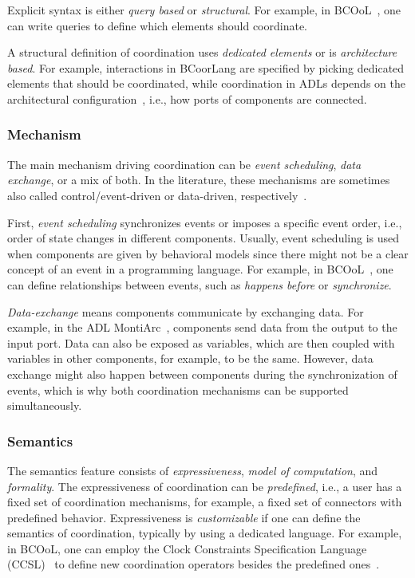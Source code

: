 \documentclass[runningheads]{llncs}
\begin{document}
Explicit syntax is either \textit{query based} or \textit{structural}.
For example, in BCOoL~\cite{varalarsenBCOolBehavioralCoordination2016,varalarsenBehavioralCoordinationOperator2015}, one can write queries to define which elements should coordinate.

A structural definition of coordination uses \textit{dedicated elements} or is \textit{architecture based}.
For example, interactions in BCoorLang are specified by picking dedicated elements that should be coordinated, while coordination in ADLs depends on the architectural configuration~\cite{medvidovicClassificationComparisonFramework2000}, i.e., how ports of components are connected.

\subsubsection{Mechanism} The main mechanism driving coordination can be \textit{event scheduling}, \textit{data exchange}, or a mix of both.
In the literature, these mechanisms are sometimes also called control/event-driven or data-driven, respectively~\cite{papadopoulosCoordinationModelsLanguages1998,varalarsenBCOolBehavioralCoordination2016}.

First, \textit{event scheduling} synchronizes events or imposes a specific event order, i.e., order of state changes in different components.
Usually, event scheduling is used when components are given by behavioral models since there might not be a clear concept of an event in a programming language.
For example, in BCOoL~\cite{varalarsenBehavioralCoordinationOperator2015}, one can define relationships between events, such as \textit{happens before} or \textit{synchronize}.

\textit{Data-exchange} means components communicate by exchanging data.
For example, in the ADL MontiArc~\cite{haberMontiArcArchitecturalModeling2014}, components send data from the output to the input port.
Data can also be exposed as variables, which are then coupled with variables in other components, for example, to be the same.
However, data exchange might also happen between components during the synchronization of events, which is why both coordination mechanisms can be supported simultaneously.

\subsubsection{Semantics} The semantics feature consists of \textit{expressiveness}, \textit{model of computation}, and \textit{formality}.
The expressiveness of coordination can be \textit{predefined}, i.e., a user has a fixed set of coordination mechanisms, for example, a fixed set of connectors with predefined behavior.
Expressiveness is \textit{customizable} if one can define the semantics of coordination, typically by using a dedicated language.
For example, in BCOoL, one can employ the Clock Constraints Specification Language (CCSL)~\cite{andreSyntaxSemanticsClock2009} to define new coordination operators besides the predefined ones~\cite{varalarsenBCOolBehavioralCoordination2016,varalarsenBehavioralCoordinationOperator2015}.
\end{document}

